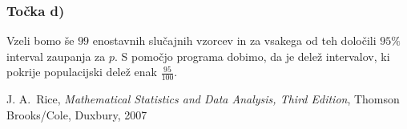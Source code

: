 \documentclass[12pt, letterpaper]{article}
\begin{document}
\subsubsection*{Točka d)} Vzeli bomo še $99$ enostavnih slučajnih vzorcev in za vsakega od teh določili $95\%$ interval zaupanja za $p$. S pomočjo programa dobimo, da je delež intervalov, ki pokrije populacijski delež enak $\frac{95}{100}$.



\begin{thebibliography}{99}
 J. A.~Rice, \emph{Mathematical Statistics and Data Analysis, Third Edition}, Thomson Brooks/Cole, Duxbury, 2007
\end{thebibliography}
\end{document}
